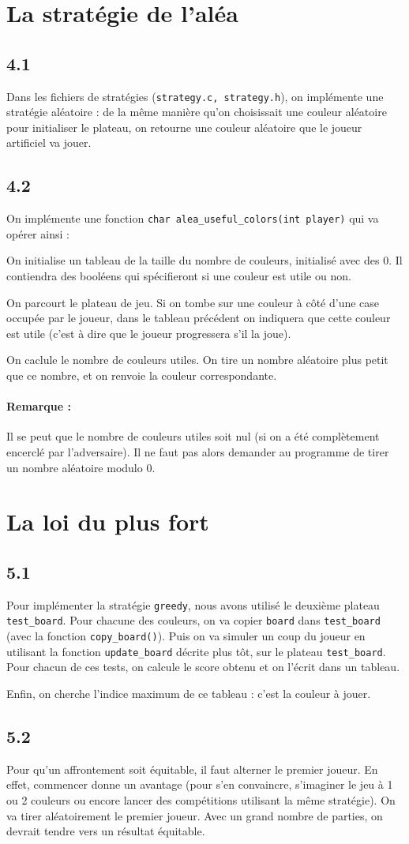 \documentclass[12pt]{article}
\def\question#1{\subsection*{#1}}
\def\sec#1{\section{#1}}
\begin{document}
\sec{La stratégie de l'aléa}
\question{4.1}
Dans les fichiers de stratégies (\texttt{strategy.c, strategy.h}), on implémente une stratégie aléatoire : de la même manière qu'on choisissait une couleur aléatoire pour initialiser le plateau, on retourne une couleur aléatoire que le joueur artificiel va jouer.

\question{4.2}
On implémente une fonction \texttt{char alea\_useful\_colors(int player)} qui va opérer ainsi :

On initialise un tableau de la taille du nombre de couleurs, initialisé avec des 0. Il contiendra des booléens qui spécifieront si une couleur est utile ou non.

On parcourt le plateau de jeu. Si on tombe sur une couleur à côté d'une case occupée par le joueur, dans le tableau précédent on indiquera que cette couleur est utile (c'est à dire que le joueur progressera s'il la joue).

On caclule le nombre de couleurs utiles. On tire un nombre aléatoire plus petit que ce nombre, et on renvoie la couleur correspondante.

\paragraph{Remarque :} Il se peut que le nombre de couleurs utiles soit nul (si on a été complètement encerclé par l'adversaire). Il ne faut pas alors demander au programme de tirer un nombre aléatoire modulo 0.

\sec{La loi du plus fort}
\question{5.1}
Pour implémenter la stratégie \texttt{greedy}, nous avons utilisé le deuxième plateau \texttt{test\_board}.
Pour chacune des couleurs, on va copier \texttt{board} dans \texttt{test\_board} (avec la fonction \texttt{copy\_board()}). Puis on va simuler un coup du joueur en utilisant la fonction \texttt{update\_board} décrite plus tôt, sur le plateau \texttt{test\_board}. Pour chacun de ces tests, on calcule le score obtenu et on l'écrit dans un tableau.

Enfin, on cherche l'indice maximum de ce tableau : c'est la couleur à jouer.


\question{5.2}
Pour qu'un affrontement soit équitable, il faut alterner le premier joueur. En effet, commencer donne un avantage (pour s'en convaincre, s'imaginer le jeu à 1 ou 2 couleurs ou encore lancer des compétitions utilisant la même stratégie). On va tirer aléatoirement le premier joueur. Avec un grand nombre de parties, on devrait tendre vers un résultat équitable.
\end{document}
